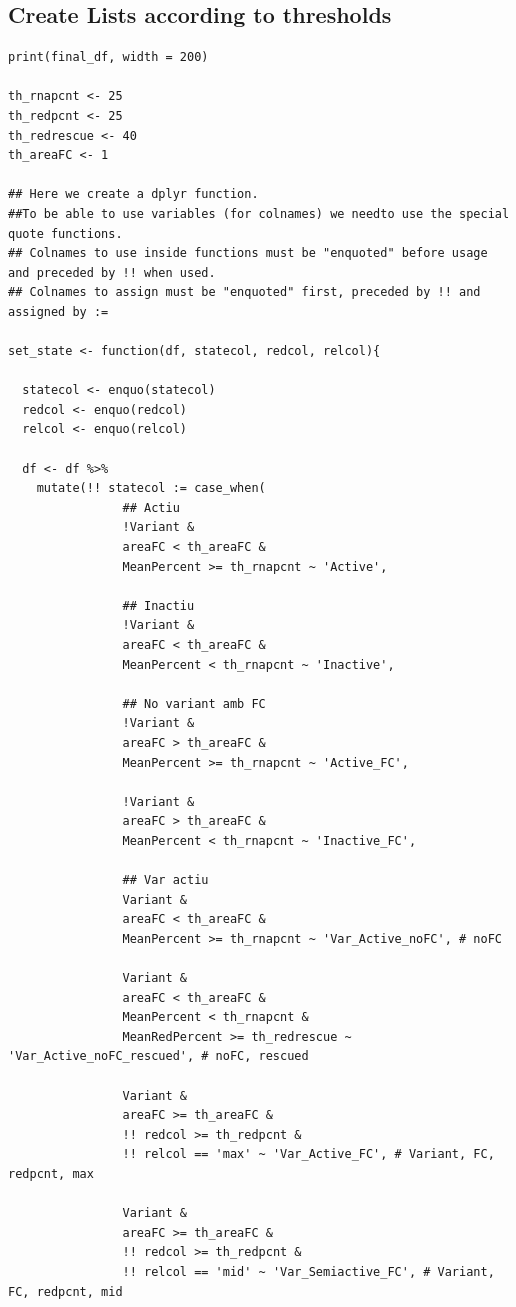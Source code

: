 \documentclass[11pt]{article}
\begin{document}
\subsection{Create Lists according to thresholds}
\label{sec:orgaed8bfb}
\begin{verbatim}
print(final_df, width = 200)

th_rnapcnt <- 25
th_redpcnt <- 25
th_redrescue <- 40
th_areaFC <- 1

## Here we create a dplyr function.
##To be able to use variables (for colnames) we needto use the special quote functions.
## Colnames to use inside functions must be "enquoted" before usage and preceded by !! when used.
## Colnames to assign must be "enquoted" first, preceded by !! and assigned by :=

set_state <- function(df, statecol, redcol, relcol){

  statecol <- enquo(statecol)
  redcol <- enquo(redcol)
  relcol <- enquo(relcol)

  df <- df %>%
    mutate(!! statecol := case_when(
                ## Actiu
                !Variant &
                areaFC < th_areaFC &
                MeanPercent >= th_rnapcnt ~ 'Active',

                ## Inactiu
                !Variant &
                areaFC < th_areaFC &
                MeanPercent < th_rnapcnt ~ 'Inactive',

                ## No variant amb FC
                !Variant &
                areaFC > th_areaFC &
                MeanPercent >= th_rnapcnt ~ 'Active_FC',

                !Variant &
                areaFC > th_areaFC &
                MeanPercent < th_rnapcnt ~ 'Inactive_FC',

                ## Var actiu
                Variant &
                areaFC < th_areaFC &
                MeanPercent >= th_rnapcnt ~ 'Var_Active_noFC', # noFC

                Variant &
                areaFC < th_areaFC &
                MeanPercent < th_rnapcnt &
                MeanRedPercent >= th_redrescue ~ 'Var_Active_noFC_rescued', # noFC, rescued

                Variant &
                areaFC >= th_areaFC &
                !! redcol >= th_redpcnt &
                !! relcol == 'max' ~ 'Var_Active_FC', # Variant, FC, redpcnt, max

                Variant &
                areaFC >= th_areaFC &
                !! redcol >= th_redpcnt &
                !! relcol == 'mid' ~ 'Var_Semiactive_FC', # Variant, FC, redpcnt, mid


\end{verbatim}
\end{document}
